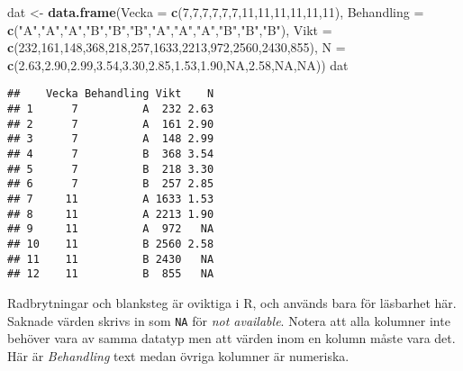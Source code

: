\documentclass[
]{book}
\newenvironment{Shaded}{\begin{snugshade}}{\end{snugshade}}
\newcommand{\AttributeTok}[1]{\textcolor[rgb]{0.13,0.29,0.53}{#1}}
\newcommand{\ConstantTok}[1]{\textcolor[rgb]{0.56,0.35,0.01}{#1}}
\newcommand{\DecValTok}[1]{\textcolor[rgb]{0.00,0.00,0.81}{#1}}
\newcommand{\FloatTok}[1]{\textcolor[rgb]{0.00,0.00,0.81}{#1}}
\newcommand{\FunctionTok}[1]{\textcolor[rgb]{0.13,0.29,0.53}{\textbf{#1}}}
\newcommand{\NormalTok}[1]{#1}
\newcommand{\OtherTok}[1]{\textcolor[rgb]{0.56,0.35,0.01}{#1}}
\newcommand{\StringTok}[1]{\textcolor[rgb]{0.31,0.60,0.02}{#1}}
\theoremstyle{definition}
\theoremstyle{definition}
\theoremstyle{definition}
\theoremstyle{definition}
\theoremstyle{remark}
\begin{document}
\begin{Shaded}
\begin{Highlighting}[]
\NormalTok{dat }\OtherTok{\textless{}{-}} \FunctionTok{data.frame}\NormalTok{(}\AttributeTok{Vecka =} \FunctionTok{c}\NormalTok{(}\DecValTok{7}\NormalTok{,}\DecValTok{7}\NormalTok{,}\DecValTok{7}\NormalTok{,}\DecValTok{7}\NormalTok{,}\DecValTok{7}\NormalTok{,}\DecValTok{7}\NormalTok{,}\DecValTok{11}\NormalTok{,}\DecValTok{11}\NormalTok{,}\DecValTok{11}\NormalTok{,}\DecValTok{11}\NormalTok{,}\DecValTok{11}\NormalTok{,}\DecValTok{11}\NormalTok{),}
                  \AttributeTok{Behandling =} \FunctionTok{c}\NormalTok{(}\StringTok{"A"}\NormalTok{,}\StringTok{"A"}\NormalTok{,}\StringTok{"A"}\NormalTok{,}\StringTok{"B"}\NormalTok{,}\StringTok{"B"}\NormalTok{,}\StringTok{"B"}\NormalTok{,}\StringTok{"A"}\NormalTok{,}\StringTok{"A"}\NormalTok{,}\StringTok{"A"}\NormalTok{,}\StringTok{"B"}\NormalTok{,}\StringTok{"B"}\NormalTok{,}\StringTok{"B"}\NormalTok{),}
                  \AttributeTok{Vikt =} \FunctionTok{c}\NormalTok{(}\DecValTok{232}\NormalTok{,}\DecValTok{161}\NormalTok{,}\DecValTok{148}\NormalTok{,}\DecValTok{368}\NormalTok{,}\DecValTok{218}\NormalTok{,}\DecValTok{257}\NormalTok{,}\DecValTok{1633}\NormalTok{,}\DecValTok{2213}\NormalTok{,}\DecValTok{972}\NormalTok{,}\DecValTok{2560}\NormalTok{,}\DecValTok{2430}\NormalTok{,}\DecValTok{855}\NormalTok{),}
                  \AttributeTok{N =} \FunctionTok{c}\NormalTok{(}\FloatTok{2.63}\NormalTok{,}\FloatTok{2.90}\NormalTok{,}\FloatTok{2.99}\NormalTok{,}\FloatTok{3.54}\NormalTok{,}\FloatTok{3.30}\NormalTok{,}\FloatTok{2.85}\NormalTok{,}\FloatTok{1.53}\NormalTok{,}\FloatTok{1.90}\NormalTok{,}\ConstantTok{NA}\NormalTok{,}\FloatTok{2.58}\NormalTok{,}\ConstantTok{NA}\NormalTok{,}\ConstantTok{NA}\NormalTok{))}
\NormalTok{dat}
\end{Highlighting}
\end{Shaded}

\begin{verbatim}
##    Vecka Behandling Vikt    N
## 1      7          A  232 2.63
## 2      7          A  161 2.90
## 3      7          A  148 2.99
## 4      7          B  368 3.54
## 5      7          B  218 3.30
## 6      7          B  257 2.85
## 7     11          A 1633 1.53
## 8     11          A 2213 1.90
## 9     11          A  972   NA
## 10    11          B 2560 2.58
## 11    11          B 2430   NA
## 12    11          B  855   NA
\end{verbatim}

Radbrytningar och blanksteg är oviktiga i R, och används bara för läsbarhet här. Saknade värden skrivs in som \texttt{NA} för \emph{not available}. Notera att alla kolumner inte behöver vara av samma datatyp men att värden inom en kolumn måste vara det. Här är \emph{Behandling} text medan övriga kolumner är numeriska.
\end{document}
